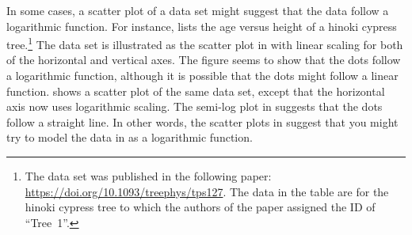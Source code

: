 \documentclass[a4paper,oneside,12pt]{article}
\begin{document}
In some cases, a scatter plot of a data set might suggest that the
data follow a logarithmic function.  For instance,
 lists the age versus height of a
hinoki cypress tree.\footnote{
  The data set was published in the following paper:
  \url{https://doi.org/10.1093/treephys/tps127}.
  The data in the table are for the hinoki cypress tree to which the
  authors of the paper assigned the ID of ``Tree~1''.
}
The data set is illustrated as the scatter plot in
 with linear scaling for
both of the horizontal and vertical axes.  The figure seems to show
that the dots follow a logarithmic function, although it is possible
that the dots might follow a linear function.
 shows a scatter plot of the
same data set, except that the horizontal axis now uses logarithmic
scaling.  The semi-log plot in
 suggests that the dots
follow a straight line.  In other words, the scatter plots in
 suggest that you might try to
model the data in  as a
logarithmic function.

\begin{table}[!htbp]
\centering

\caption{%
  The age of a hinoki cypress tree versus its height.  Age is measured
  in tree years and height is measured in metres.
}
\label{tab:logarithm:hinoki_cypress}
\end{table}
\end{document}

